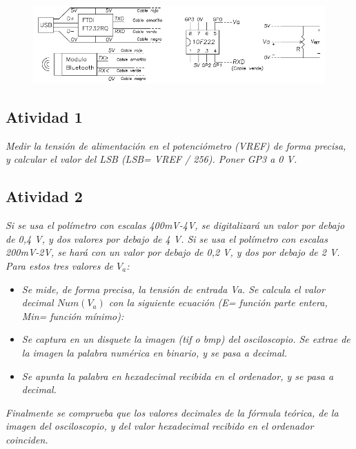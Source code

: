 \documentclass[paper=a4, fontsize=11pt]{scrartcl} %
\numberwithin{equation}{section} %
\numberwithin{figure}{section} %
\numberwithin{table}{section} %
\begin{document}
\begin{figure}[H]
\centering
\includegraphics[width=1\linewidth]{image/p7}
\label{fig:p7}
\end{figure}

\subsection{Atividad 1}

\textit{Medir la tensión de alimentación en el potenciómetro (VREF) de forma precisa, y calcular el valor del LSB (LSB= VREF / 256). Poner GP3 a 0 V.}

\subsection{Atividad 2}

\textit{Si se usa el polímetro con escalas 400mV-4V, se digitalizará un valor por debajo de 0,4 V, y dos valores por debajo de 4 V. Si se usa el polímetro con escalas 200mV-2V, se hará con un valor por debajo de 0,2 V, y dos por debajo de 2 V. Para estos tres valores de $ V_{a} $:}

\begin{itemize}
	\item \textit{Se mide, de forma precisa, la tensión de entrada Va. Se calcula el valor decimal $ Num(V_{a}) $ con la siguiente ecuación (E= función parte entera, Min= función mínimo):}
	\item \textit{Se captura en un disquete la imagen (tif o bmp) del osciloscopio. Se extrae de la imagen la palabra numérica en binario, y se pasa a decimal.}
	\item \textit{Se apunta la palabra en hexadecimal recibida en el ordenador, y se pasa a decimal.}
\end{itemize}

\textit{Finalmente se comprueba que los valores decimales de la fórmula teórica, de la imagen del osciloscopio, y del valor hexadecimal recibido en el ordenador coinciden.}
\end{document}
